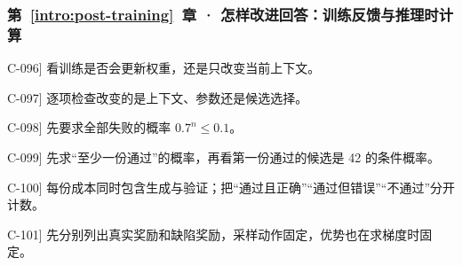 \subsubsection*{第~\ref*{intro:post-training}~章 · 怎样改进回答：训练反馈与推理时计算}
\begin{answerhints}
\item[\hyperref[exercise:reference-policy-role]{C-096}] \leavevmode{}\label{hint:reference-policy-role}看训练是否会更新权重，还是只改变当前上下文。
\item[\hyperref[exercise:reasoning-interventions]{C-097}] \leavevmode{}\label{hint:reasoning-interventions}逐项检查改变的是上下文、参数还是候选选择。
\item[\hyperref[exercise:candidate-success-budget]{C-098}] \leavevmode{}\label{hint:candidate-success-budget}先要求全部失败的概率 $0.7^n\le0.1$。
\item[\hyperref[exercise:faulty-verifier-limit]{C-099}] \leavevmode{}\label{hint:faulty-verifier-limit}先求“至少一份通过”的概率，再看第一份通过的候选是 42 的条件概率。
\item[\hyperref[exercise:verifier-budget-design]{C-100}] \leavevmode{}\label{hint:verifier-budget-design}每份成本同时包含生成与验证；把“通过且正确”“通过但错误”“不通过”分开计数。
\item[\hyperref[exercise:reward-verifier-audit]{C-101}] \leavevmode{}\label{hint:reward-verifier-audit}先分别列出真实奖励和缺陷奖励，采样动作固定，优势也在求梯度时固定。
\end{answerhints}
